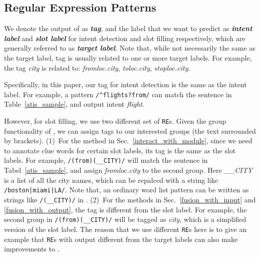 \subsection{Regular Expression Patterns}
\label{re_desc}
We denote the output of \RE as \textbf{\emph{\RE tag}}, and the label that we want to predict as \textbf{\emph{intent label}} and \textbf{\emph{slot label}} for intent detection and slot filling respectively, which are generally referred to as \textbf{\emph{target label}}. 
Note that, while not necessarily the same as the target label, \RE tag is usually related to one or more target labels. For example, the \RE tag \emph{city} is related to: \emph{fromloc.city}, \emph{toloc.city}, \emph{stoploc.city}.

Specifically, in this paper, our \RE tag for intent detection is the same as the intent label. For example, a pattern 
\texttt{/\textasciicircum flights?\:from/} can match the sentence in Table~\ref{atis_sample}, and output intent \emph{flight}. 

However, for slot filling, we use two different set of \texttt{RE}s. 
Given the group functionality of \RE, we can assign tags to our interested groups (the text surrounded by brackets). 
(1)~For the method in Sec.~\ref{interact_with_module}, since we need to annotate clue words for certain slot labels, its \RE tag is the same as the slot labels. 
For example, \texttt{/(from)\:(\_\_CITY)/} will match the sentence in Tabel~\ref{atis_sample}, and assign \emph{fromloc.city} to the second group. 
Here \emph{\_\_CITY} is a list of all the city names, which can be repalced with a string like \texttt{/boston|miami|LA/}. 
Note that, an ordinary word list pattern can be written as strings like \texttt{/(\_\_CITY)/} in \RE.
(2)~For the methods in Sec.~\ref{fusion_with_input} and \ref{fusion_with_output}, the \RE tag is different from the slot label. For example, the second group in \texttt{/(from)\:(\_\_CITY)/} will be tagged as \emph{city}, which is a simplified version of the slot label. The reason that we use different \texttt{RE}s here is to give an example that \texttt{RE}s with output different from the target labels can also make improvements to \NN.


